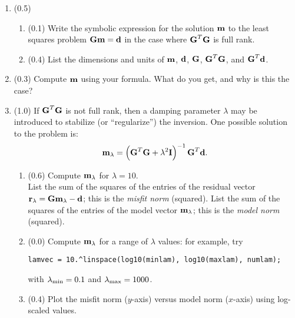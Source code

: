 \documentclass[11pt,titlepage,fleqn]{article}
\begin{document}
\begin{enumerate}
\item (0.5)
\begin{enumerate}
\item (0.1) Write the symbolic expression for the solution $\mbox{${\bf m}$}$ to the least squares problem $\mbox{${\bf G}$}\mbox{${\bf m}$}=\mbox{${\bf d}$}$ in the case where $\mbox{${\bf G}$}^T\mbox{${\bf G}$}$ is full rank.

\item (0.4) List the dimensions and units of $\mbox{${\bf m}$}$, $\mbox{${\bf d}$}$, $\mbox{${\bf G}$}$, $\mbox{${\bf G}$}^T\mbox{${\bf G}$}$, and $\mbox{${\bf G}$}^T\mbox{${\bf d}$}$.
\end{enumerate}


\item (0.3) Compute $\mbox{${\bf m}$}$ using your formula.  What do you get, and why is this the case?


\item (1.0) If $\mbox{${\bf G}$}^T\mbox{${\bf G}$}$ is not full rank, then a damping parameter $\lambda$ may be introduced to stabilize (or ``regularize'') the inversion.  One possible solution to the problem is:
%
\begin{equation}
\mbox{${\bf m}$}_{\lambda} = \left(\mbox{${\bf G}$}^T\mbox{${\bf G}$}+\lambda^2\mbox{${\bf I}$}\right)^{-1}\mbox{${\bf G}$}^T\mbox{${\bf d}$}.
\end{equation}
%
\begin{enumerate}

\item (0.6) Compute $\mbox{${\bf m}$}_{\lambda}$ for $\lambda = 10$. \\
List the sum of the squares of the entries of the residual vector $\mbox{${\bf r}$}_\lambda = \mbox{${\bf G}$}\mbox{${\bf m}$}_\lambda-\mbox{${\bf d}$}$; this is the {\em misfit norm} (squared).
List the sum of the squares of the entries of the model vector $\mbox{${\bf m}$}_{\lambda}$; this is the {\em model norm} (squared).


\item (0.0) Compute $\mbox{${\bf m}$}_{\lambda}$ for a range of $\lambda$ values: for example, try

\verb+lamvec = 10.^linspace(log10(minlam), log10(maxlam), numlam);+

with $\lambda_{\rm min} = 0.1$ and $\lambda_{\rm max} = 1000$.


\item (0.4) Plot the misfit norm ($y$-axis) versus model norm ($x$-axis) using log-scaled values.



\end{enumerate}
\end{enumerate}
\end{document}
